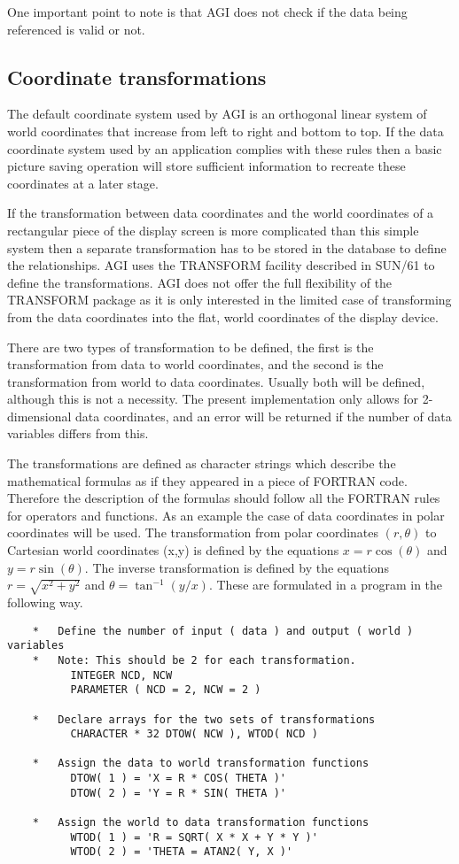 \documentclass[twoside,11pt]{article}
\newcommand{\xref}[3]{#1}
\renewcommand{\_}{\texttt{\symbol{95}}}
\begin{document}
One important point to note is that AGI does not check if the data being
referenced is valid or not.

\subsection{Coordinate transformations}\label{tran}
The default coordinate system used by AGI is an orthogonal linear
system of world coordinates that increase from left to right and
bottom to top. If the data coordinate system used by an application
complies with these rules then a basic picture saving operation
will store sufficient information to recreate these coordinates at a
later stage.

If the transformation between data coordinates and the world coordinates
of a rectangular piece of the display screen is more complicated than
this simple system then a separate transformation has to be stored in
the database to define the relationships.
AGI uses the TRANSFORM facility described in \xref{SUN/61}{sun61}{}
to define the
transformations. AGI does not offer the full flexibility of the TRANSFORM
package as it is only interested in the limited case of transforming
from the data coordinates into the flat, world coordinates of the display
device.

There are two types of transformation to be defined, the first is the
transformation from data to world coordinates, and the second is the
transformation from world to data coordinates. Usually both will be
defined, although this is not a necessity.
The present implementation only allows for 2-dimensional data
coordinates, and an error will be returned if the number of data
variables differs from this.

The transformations are defined as character strings which describe the
mathematical formulas as if they appeared in a piece of FORTRAN code.
Therefore the description of the formulas should follow all the FORTRAN
rules for operators and functions. As an example the case of data
coordinates in polar coordinates will be used. The transformation
from polar coordinates $(r,\theta)$ to Cartesian world coordinates (x,y)
is defined by the equations
$x = r \cos( \theta )$ and $y = r \sin( \theta )$.
The inverse transformation is defined by the equations
$r = \sqrt{x^2+y^2}$ and $\theta = \tan^{-1}(y/x)$.
These are formulated in a program in the following way.
\begin{verbatim}
    *   Define the number of input ( data ) and output ( world ) variables
    *   Note: This should be 2 for each transformation.
          INTEGER NCD, NCW
          PARAMETER ( NCD = 2, NCW = 2 )

    *   Declare arrays for the two sets of transformations
          CHARACTER * 32 DTOW( NCW ), WTOD( NCD )

    *   Assign the data to world transformation functions
          DTOW( 1 ) = 'X = R * COS( THETA )'
          DTOW( 2 ) = 'Y = R * SIN( THETA )'

    *   Assign the world to data transformation functions
          WTOD( 1 ) = 'R = SQRT( X * X + Y * Y )'
          WTOD( 2 ) = 'THETA = ATAN2( Y, X )'
\end{verbatim}
\end{document}
